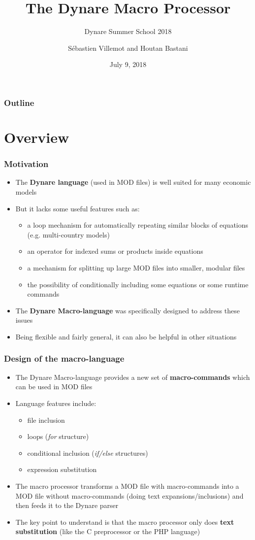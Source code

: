 \documentclass{beamer}
\title{The Dynare Macro Processor}
\subtitle{Dynare Summer School 2018}
\author{Sébastien Villemot and Houtan Bastani}
\institute{CEPREMAP}
\date{July 9, 2018}
\begin{document}
\begin{frame}
  \titlepage
\end{frame}

\begin{frame}
  \frametitle{Outline}
  \tableofcontents
\end{frame}

\section{Overview}

\begin{frame}
  \frametitle{Motivation}
  \begin{itemize}
  \item The \textbf{Dynare language} (used in MOD files) is well suited for many economic models
  \item But it lacks some useful features such as:
    \begin{itemize}
    \item a loop mechanism for automatically repeating similar blocks of equations (e.g. multi-country models)
    \item an operator for indexed sums or products inside equations
    \item a mechanism for splitting up large MOD files into smaller, modular files
    \item the possibility of conditionally including some equations or some runtime commands
  \end{itemize}
  \item The \textbf{Dynare Macro-language} was specifically designed to address these issues
  \item Being flexible and fairly general, it can also be helpful in other situations
  \end{itemize}
\end{frame}

\begin{frame}
  \frametitle{Design of the macro-language}
  \begin{itemize}
  \item The Dynare Macro-language provides a new set of \textbf{macro-commands} which can be used in MOD files
  \item Language features include:
    \begin{itemize}
    \item file inclusion
    \item loops (\textit{for} structure)
    \item conditional inclusion (\textit{if/else} structures)
    \item expression substitution
    \end{itemize}
  \item The macro processor transforms a MOD file with macro-commands into a MOD file without macro-commands (doing text expansions/inclusions) and then feeds it to the Dynare parser
  \item The key point to understand is that the macro processor only does \textbf{text substitution} (like the C preprocessor or the PHP language)
  \end{itemize}
\end{frame}
\end{document}
